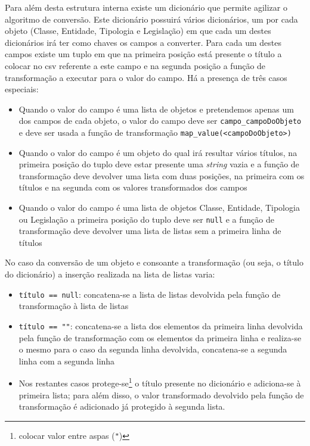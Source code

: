 Para além desta estrutura interna existe um dicionário que permite agilizar o algoritmo de conversão. Este dicionário possuirá vários dicionários, um por cada objeto (Classe, Entidade, Tipologia e Legislação) em que cada um destes dicionários irá ter como chaves os campos a converter. Para cada um destes campos existe um tuplo em que na primeira posição está presente o título a colocar no \acrshort{csv} referente a este campo e na segunda posição a função de transformação a executar para o valor do campo. Há a presença de três casos especiais:
\begin{itemize}
    \item Quando o valor do campo é uma lista de objetos e pretendemos apenas um dos campos de cada objeto, o valor do campo deve ser \verb|campo_campoDoObjeto| e deve ser usada a função de transformação \verb|map_value(<campoDoObjeto>)|
    \item Quando o valor do campo é um objeto do qual irá resultar vários títulos, na primeira posição do tuplo deve estar presente uma \textit{string} vazia e a função de transformação deve devolver uma lista com duas posições, na primeira com os títulos e na segunda com os valores transformados dos campos
    \item Quando o valor do campo é uma lista de objetos Classe, Entidade, Tipologia ou Legislação a primeira posição do tuplo deve ser \texttt{null} e a função de transformação deve devolver uma lista de listas sem a primeira linha de títulos
\end{itemize}
No caso da conversão de um objeto e consoante a transformação (ou seja, o título do dicionário) a inserção realizada na lista de listas varia:
\begin{itemize}
    \item \verb|título == null|: concatena-se a lista de listas devolvida pela função de transformação à lista de listas
    \item \verb|título == ""|: concatena-se a lista dos elementos da primeira linha devolvida pela função de transformação com os elementos da primeira linha e realiza-se o mesmo para o caso da segunda linha devolvida, concatena-se a segunda linha com a segunda linha
    \item Nos restantes casos protege-se\footnote{colocar valor entre aspas (\texttt{"})} o título presente no dicionário e adiciona-se à primeira lista; para além disso, o valor transformado devolvido pela função de transformação é adicionado já protegido à segunda lista.
\end{itemize}

